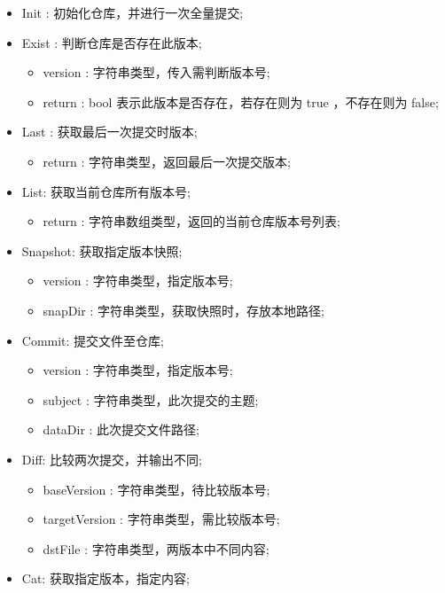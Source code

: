 \documentclass{utart}
\begin{document}
\begin{itemize}[leftmargin=4em]
  \item Init : 初始化仓库，并进行一次全量提交;
  \item Exist : 判断仓库是否存在此版本;
  \begin{itemize}[leftmargin=4em]
    \item version : 字符串类型，传入需判断版本号;
    \item return : bool 表示此版本是否存在，若存在则为 true ，不存在则为 false;
  \end{itemize}
  \item Last : 获取最后一次提交时版本;
  \begin{itemize}[leftmargin=4em]
    \item return : 字符串类型，返回最后一次提交版本;
  \end{itemize}
  \item List: 获取当前仓库所有版本号;
  \begin{itemize}[leftmargin=4em]
    \item return : 字符串数组类型，返回的当前仓库版本号列表;
  \end{itemize}
  \item Snapshot: 获取指定版本快照;
  \begin{itemize}[leftmargin=4em]
    \item version : 字符串类型，指定版本号;
    \item snapDir : 字符串类型，获取快照时，存放本地路径;
  \end{itemize}
  \item Commit: 提交文件至仓库;
  \begin{itemize}[leftmargin=4em]
    \item version : 字符串类型，指定版本号;
    \item subject : 字符串类型，此次提交的主题;
    \item dataDir : 此次提交文件路径;
  \end{itemize}
  \item Diff: 比较两次提交，并输出不同;
  \begin{itemize}[leftmargin=4em]
    \item baseVersion : 字符串类型，待比较版本号;
    \item targetVersion : 字符串类型，需比较版本号;
    \item dstFile : 字符串类型，两版本中不同内容;
  \end{itemize}
  \item Cat: 获取指定版本，指定内容;
  \begin{itemize}[leftmargin=4em]

\end{itemize}
\end{itemize}
\end{document}
